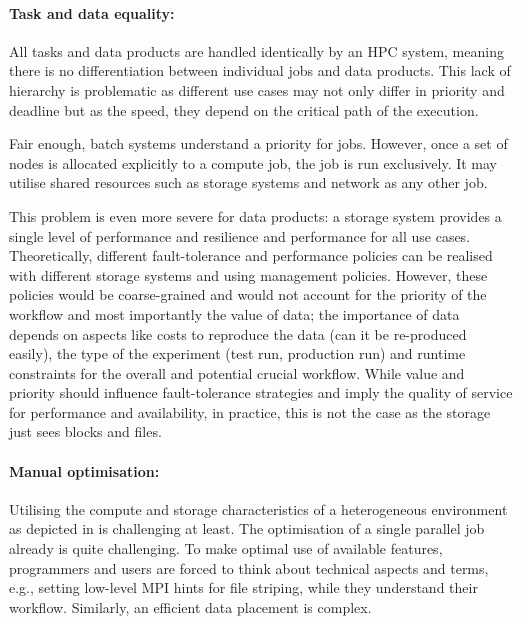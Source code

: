 \documentclass[a4paper, twocolumn]{article}
\begin{document}
\paragraph{Task and data equality:}

All tasks and data products are handled identically by an HPC system, meaning there is no differentiation between individual jobs and data products.
This lack of hierarchy is problematic as different use cases may not only differ in priority and deadline but as the speed, they depend on the critical path of the execution.

Fair enough, batch systems understand a priority for jobs.
However, once a set of nodes is allocated explicitly to a compute job, the job is run exclusively. It may utilise shared resources such as storage systems and network as any other job. %

This problem is even more severe for data products: a storage system provides a single level of performance and resilience and performance for all use cases.
Theoretically, different fault-tolerance and performance policies can be realised with different storage systems and using management policies.
However, these policies would be coarse-grained and would not account for the priority of the workflow and most importantly the value of data;
the importance of data depends on aspects like costs to reproduce the data (can it be re-produced easily), the type of the experiment (test run, production run) and runtime constraints for the overall and potential crucial workflow.
While value and priority should influence fault-tolerance strategies and imply the quality of service for performance and availability, in practice, this is not the case as the storage just sees blocks and files.

\paragraph{Manual optimisation:}
Utilising the compute and storage characteristics of a heterogeneous environment as depicted in  is challenging at least.
The optimisation of a single parallel job already is quite challenging.
To make optimal use of available features, programmers and users are forced to think about technical aspects and terms, e.g., setting low-level MPI hints for file striping, while they understand their workflow.
Similarly, an efficient data placement is complex.
\end{document}
